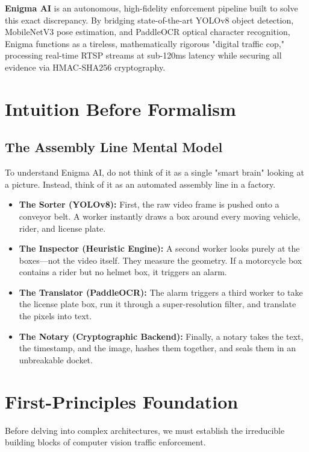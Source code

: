 \documentclass[12pt,a4paper]{article}
\begin{document}
\indent \textbf{Enigma AI} is an autonomous, high-fidelity enforcement pipeline built to solve this exact discrepancy. By bridging state-of-the-art YOLOv8 object detection, MobileNetV3 pose estimation, and PaddleOCR optical character recognition, Enigma functions as a tireless, mathematically rigorous "digital traffic cop," processing real-time RTSP streams at sub-120ms latency while securing all evidence via HMAC-SHA256 cryptography.

\section{Intuition Before Formalism}
\subsection{The Assembly Line Mental Model}
\indent To understand Enigma AI, do not think of it as a single "smart brain" looking at a picture. Instead, think of it as an automated assembly line in a factory.

\begin{itemize}
    \item \textbf{The Sorter (YOLOv8):} First, the raw video frame is pushed onto a conveyor belt. A worker instantly draws a box around every moving vehicle, rider, and license plate.
    \item \textbf{The Inspector (Heuristic Engine):} A second worker looks purely at the boxes—not the video itself. They measure the geometry. If a motorcycle box contains a rider but no helmet box, it triggers an alarm.
    \item \textbf{The Translator (PaddleOCR):} The alarm triggers a third worker to take the license plate box, run it through a super-resolution filter, and translate the pixels into text.
    \item \textbf{The Notary (Cryptographic Backend):} Finally, a notary takes the text, the timestamp, and the image, hashes them together, and seals them in an unbreakable docket.
\end{itemize}

\section{First-Principles Foundation}
\indent Before delving into complex architectures, we must establish the irreducible building blocks of computer vision traffic enforcement.
\end{document}
